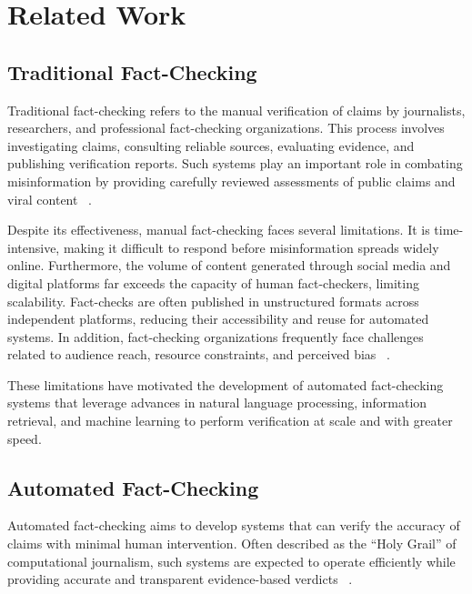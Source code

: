 \chapter{Related Work}
\label{ch:relatedWork}

\section{Traditional Fact-Checking}

Traditional fact-checking refers to the manual verification of claims by journalists, researchers, and professional fact-checking organizations. This process involves investigating claims, consulting reliable sources, evaluating evidence, and publishing verification reports. Such systems play an important role in combating misinformation by providing carefully reviewed assessments of public claims and viral content ~\cite{QuestToAutomateFactChecking2015Oct}.

Despite its effectiveness, manual fact-checking faces several limitations. It is time-intensive, making it difficult to respond before misinformation spreads widely online. Furthermore, the volume of content generated through social media and digital platforms far exceeds the capacity of human fact-checkers, limiting scalability. Fact-checks are often published in unstructured formats across independent platforms, reducing their accessibility and reuse for automated systems. In addition, fact-checking organizations frequently face challenges related to audience reach, resource constraints, and perceived bias ~\cite{QuestToAutomateFactChecking2015Oct,FactChecking2025Mar}.

These limitations have motivated the development of automated fact-checking systems that leverage advances in natural language processing, information retrieval, and machine learning to perform verification at scale and with greater speed.

\section{Automated Fact-Checking}

Automated fact-checking aims to develop systems that can verify the accuracy of claims with minimal human intervention. Often described as the “Holy Grail” of computational journalism, such systems are expected to operate efficiently while providing accurate and transparent evidence-based verdicts ~\cite{QuestToAutomateFactChecking2015Oct}.


